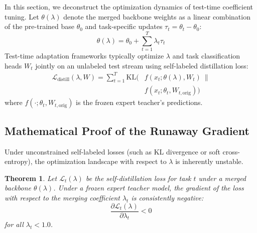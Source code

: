 \documentclass{article}
\theoremstyle{plain}
\newtheorem{theorem}{Theorem}[section]
\theoremstyle{definition}
\theoremstyle{remark}
\begin{document}
In this section, we deconstruct the optimization dynamics of test-time coefficient tuning. Let $\theta(\lambda)$ denote the merged backbone weights as a linear combination of the pre-trained base $\theta_0$ and task-specific updates $\tau_t = \theta_t - \theta_0$:
\begin{equation}
  \theta(\lambda) = \theta_0 + \sum_{t=1}^T \lambda_t \tau_t
\end{equation}
Test-time adaptation frameworks typically optimize $\lambda$ and task classification heads $W_t$ jointly on an unlabeled test stream using self-labeled distillation loss:
\begin{equation}
\begin{aligned}
  \mathcal{L}_{\text{distill}}(\lambda, W) = \sum_{t=1}^T \text{KL} \Big( &f(x_t; \theta(\lambda), W_t) \ \parallel \\
  &f(x_t; \theta_t, W_{t,\text{orig}}) \Big)
\end{aligned}
\end{equation}
where $f(\cdot; \theta_t, W_{t,\text{orig}})$ is the frozen expert teacher's predictions.

\subsection{Mathematical Proof of the Runaway Gradient}
Under unconstrained self-labeled losses (such as KL divergence or soft cross-entropy), the optimization landscape with respect to $\lambda$ is inherently unstable.

\begin{theorem}
  Let $\mathcal{L}_t(\lambda)$ be the self-distillation loss for task $t$ under a merged backbone $\theta(\lambda)$. Under a frozen expert teacher model, the gradient of the loss with respect to the merging coefficient $\lambda_t$ is consistently negative:
  \begin{equation}
    \frac{\partial \mathcal{L}_t(\lambda)}{\partial \lambda_t} < 0
  \end{equation}
  for all $\lambda_t < 1.0$.
\end{theorem}
\end{document}
